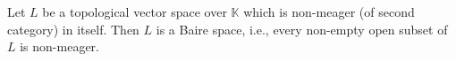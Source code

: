 Let $L$ be a topological vector space over $\mathbb{K}$ which is non-meager (of second category) in itself. Then $L$ is a Baire space, i.e., every non-empty open subset of $L$ is non-meager.
